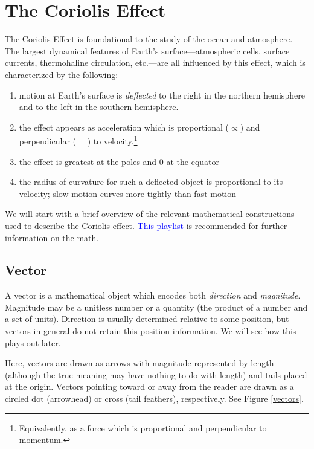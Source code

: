\chapter{The Coriolis Effect}\label{coriolis}

The Coriolis Effect is foundational to the study of the ocean and atmosphere. The largest dynamical features of Earth's surface---atmospheric cells, surface currents, thermohaline circulation, etc.---are all influenced by this effect, which is characterized by the following:
\begin{enumerate}
	\item motion at Earth's surface is \emph{deflected} to the right in the northern hemisphere and to the left in the southern hemisphere.
	\item the effect appears as acceleration which is proportional ($\propto$) and perpendicular ($\perp$) to velocity.\footnote{Equivalently, as a force which is proportional and perpendicular to momentum.}
	\item the effect is greatest at the poles and \num{0} at the equator
	\item the radius of curvature for such a deflected object is proportional to its velocity; slow motion curves more tightly than fast motion
\end{enumerate}
We will start with a brief overview of the relevant mathematical constructions used to describe the Coriolis effect. \href{https://www.youtube.com/playlist?app=desktop&list=PLZHQObOWTQDPD3MizzM2xVFitgF8hE_ab}{\textcolor{blue}{This playlist}} is recommended for further information on the math.
\section{Vector}
A vector is a mathematical object which encodes both \emph{direction} and \emph{magnitude}. Magnitude may be a unitless number or a quantity (the product of a number and a set of units). Direction is usually determined relative to some position, but vectors in general do not retain this position information. We will see how this plays out later.

Here, vectors are drawn as arrows with magnitude represented by length (although the true meaning may have nothing to do with length) and tails placed at the origin. Vectors pointing toward or away from the reader are drawn as a circled dot (arrowhead) or cross (tail feathers), respectively. See Figure \ref{vectors}.

